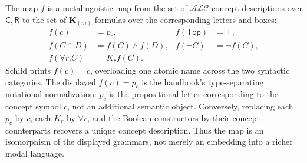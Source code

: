 The map \(f\) is a metalinguistic map from the set of
\(\mathcal{ALC}\)-concept descriptions over \(\mathsf C,\mathsf R\) to the
set of \(\mathbf K_{(m)}\)-formulas over the corresponding letters and boxes:
\[
\begin{aligned}
 f(c)&=p_c,&
 f(\mathsf{Top})&=\top,\\
 f(C\cap D)&=f(C)\land f(D),&
 f(\neg C)&=\neg f(C),\\
 f(\forall r.C)&=K_r f(C).&&
\end{aligned}
\]
Schild prints \(f(c)=c\), overloading one atomic name across the two syntactic
categories.  The displayed \(f(c)=p_c\) is the handbook's type-separating
notational normalization: \(p_c\) is the propositional letter corresponding
to the concept symbol \(c\), not an additional semantic object.  Conversely,
replacing each \(p_c\) by \(c\), each \(K_r\) by
\(\forall r\), and the Boolean constructors by their concept counterparts
recovers a unique concept description.  Thus the map is an isomorphism of the
displayed grammars, not merely an embedding into a richer modal language.

